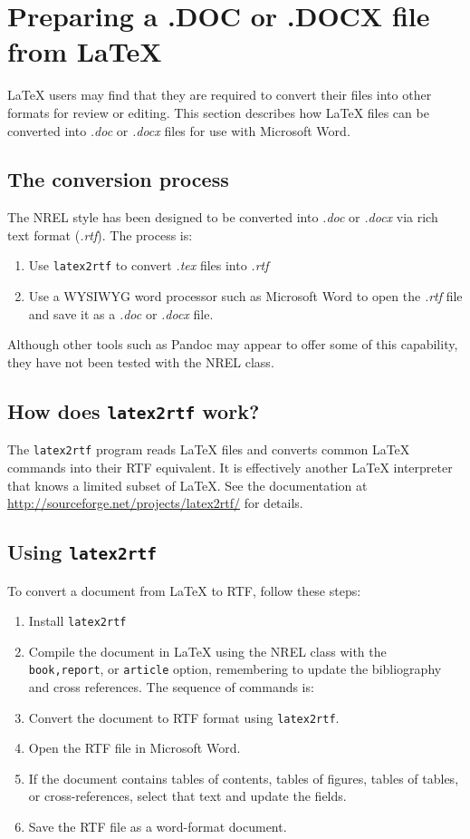 \section{Preparing a .DOC or .DOCX file from LaTeX}\label{sec:latextortf}
LaTeX users may find that they are required to convert their files into other formats for review or  editing. This section describes how LaTeX files can be converted into \emph{.doc} or \emph{.docx} files for use with Microsoft Word.

\subsection{The conversion process} 
The NREL style has been designed to be converted into \emph{.doc} or \emph{.docx} via rich text format (\emph{.rtf}). The process is:
\begin{enumerate}
\item Use \texttt{latex2rtf} to convert \emph{.tex} files into \emph{.rtf}
\item Use a WYSIWYG word processor such as Microsoft Word to open the \emph{.rtf} file and save it as a \emph{.doc} or \emph{.docx} file.
\end{enumerate}

Although other tools such as Pandoc may appear to offer some of this capability, they have not been tested with the NREL class.

\subsection{How does \texttt{latex2rtf} work?}
The \texttt{latex2rtf} program reads LaTeX files and converts common LaTeX commands into their RTF equivalent. It is effectively another LaTeX interpreter that knows a limited subset of LaTeX. See the documentation at \href{http://sourceforge.net/projects/latex2rtf/}{http://sourceforge.net/projects/latex2rtf/} for details.

\subsection{Using \texttt{latex2rtf}}
To convert a document from LaTeX to RTF, follow these steps:
\begin{enumerate}
\item Install \texttt{latex2rtf}
\item Compile the document in LaTeX using the NREL class with the \texttt{book,report}, or \texttt{article} option, remembering to update the bibliography and cross references. The sequence of commands is:
\item Convert the document to RTF format using \texttt{latex2rtf}. 
\item Open the RTF file in Microsoft Word.
\item If the document contains tables of contents, tables of figures, tables of tables, or cross-references, select that text and update the fields.
\item Save the RTF file as a word-format document.
\end{enumerate}

